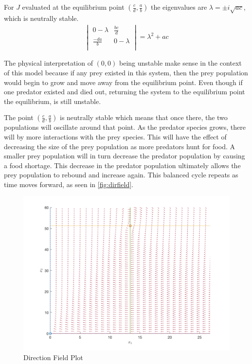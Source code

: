 \documentclass[12pt]{article}   %
\theoremstyle{definition}
\numberwithin{equation}{section}
\begin{document}
For $J$ evaluated at the equilibrium point $(\frac{c}{d},\frac{a}{b})$ the eigenvalues are  $\lambda=\pm i\sqrt{ac}$, which is neutrally stable.
\begin{align*}
  \begin{vmatrix}
    0-\lambda & \frac{bc}{d}\\
    \frac{-da}{b} & 0-\lambda\\
  \end{vmatrix}
  =\lambda^2+ac
\end{align*}

\quad The physical interpretation of $(0,0)$ being unstable make sense in the context of this model because if any prey existed in this system, then the prey population would begin to grow and move away from the equilibrium point. Even though if one predator existed and died out, returning the system to the equilibrium point the equilibrium, is still unstable. 

\quad The point $(\frac{c}{d},\frac{a}{b})$ is neutrally stable which means that once there, the two populations will oscillate around that point. As the predator species grows, there will by more interactions with the prey species. This will have the effect of decreasing the size of the prey population as more predators hunt for food. A smaller prey population will in turn decrease the predator population by causing a food shortage. This decrease in the predator population ultimately allows the prey population to rebound and increase again. This balanced cycle repeats as time moves forward, as seen in \autoref{fig:dirfield}. 

\begin{figure} [h] 
  \centering
  \includegraphics[width=15cm]{images/dirfield.png}
  \caption{Direction Field Plot}
  \label{fig:dirfield}
\end{figure}
\end{document}
